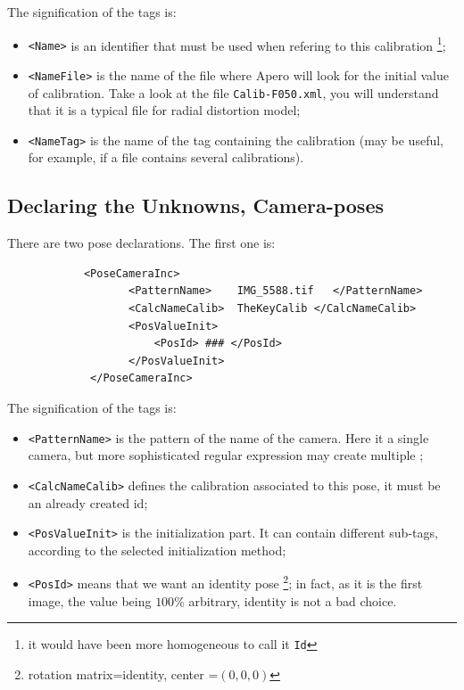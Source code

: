 The signification of the tags is:

\begin{itemize}
   \item {\tt <Name>} is an identifier that must  be used when refering to this calibration
         \footnote{it would have been more homogeneous to call it {\tt Id} };

   \item {\tt <NameFile>} is the name of the file where Apero will look for
         the initial value of calibration. Take a look at the file {\tt Calib-F050.xml},
         you will understand that it is a typical file for radial distortion model;

   \item {\tt <NameTag>} is the name of the tag containing the calibration (may be useful,
         for example, if a file contains several calibrations).
\end{itemize}





\subsection{Declaring the Unknowns, Camera-poses}

There are two pose declarations. The first one is:
{\scriptsize
\begin{verbatim}
            <PoseCameraInc>
                   <PatternName>    IMG_5588.tif   </PatternName>
                   <CalcNameCalib>  TheKeyCalib </CalcNameCalib>
                   <PosValueInit>
                       <PosId> ### </PosId>
                   </PosValueInit>
             </PoseCameraInc>
\end{verbatim}
}

The signification of the tags is:

\begin{itemize}
   \item {\tt <PatternName>} is the pattern of the name of the camera. Here
         it  a single camera, but more sophisticated regular expression
         may create multiple ;

   \item {\tt <CalcNameCalib>} defines the calibration associated to this pose,
         it must be an already created id;

    \item {\tt <PosValueInit>} is the initialization part. It can contain
          different sub-tags, according to the selected initialization method;

    \item {\tt <PosId>} means that we want an identity pose
          \footnote{rotation matrix=identity, center =$(0,0,0)$};
           in fact, as it is the first image, the value being $100\%$ arbitrary,
           identity is not a bad choice.

\end{itemize}


